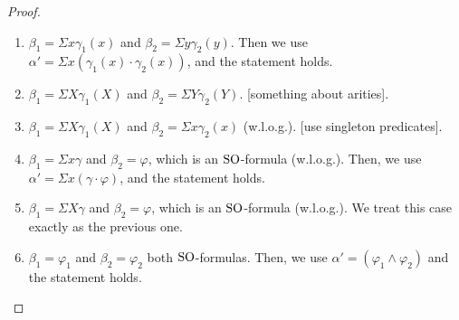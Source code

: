 \begin{proof}
\begin{enumerate}
		\begin{enumerate}
			\item $\beta_1 = \Sigma x \gamma_1(x)$ and $\beta_2 = \Sigma y \gamma_2(y)$. Then we use $\alpha' = \Sigma x(\gamma_1(x)\cdot\gamma_2(x))$, and the statement holds.
			\item $\beta_1 = \Sigma X \gamma_1(X)$ and $\beta_2 = \Sigma Y \gamma_2(Y)$. [something about arities].
			\item $\beta_1 = \Sigma X \gamma_1(X)$ and $\beta_2 = \Sigma x \gamma_2(x)$ (w.l.o.g.). [use singleton predicates].
			\item $\beta_1 = \Sigma x \gamma$ and $\beta_2 = \varphi$, which is an ${\rm SO}$-formula (w.l.o.g.). Then, we use $\alpha' = \Sigma x (\gamma \cdot \varphi)$, and the statement holds.
			\item $\beta_1 = \Sigma X \gamma$ and $\beta_2 = \varphi$, which is an ${\rm SO}$-formula (w.l.o.g.). We treat this case exactly as the previous one.
			\item $\beta_1 = \varphi_1$ and $\beta_2 = \varphi_2$ both ${\rm SO}$-formulas. Then, we use $\alpha' = (\varphi_1 \wedge \varphi_2)$ and the statement holds.
		\end{enumerate}
	\end{enumerate}
\end{proof}




